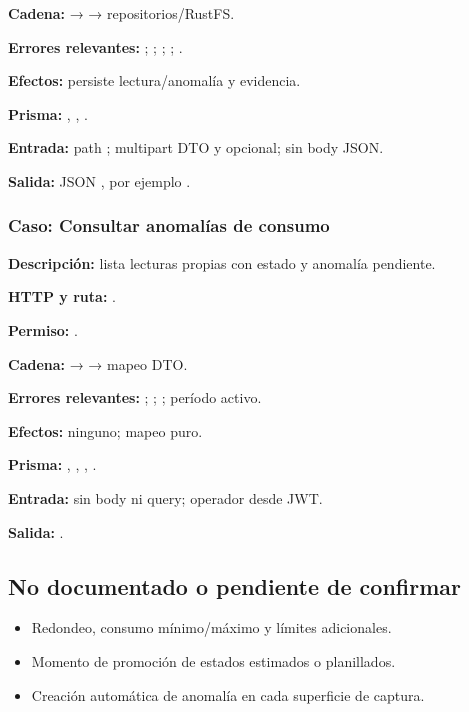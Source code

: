 \textbf{Cadena:} \texttt{} → \texttt{} → repositorios/RustFS.  

\textbf{Errores relevantes:} \texttt{}; \texttt{}; \texttt{}; \texttt{}; \texttt{}.  

\textbf{Efectos:} persiste lectura/anomalía y evidencia.  

\textbf{Prisma:} \texttt{}, \texttt{}, \texttt{}.  

\textbf{Entrada:} path \texttt{}; multipart DTO y \texttt{} opcional; sin body JSON.  

\textbf{Salida:} JSON \texttt{}, por ejemplo \texttt{}.


\subsubsection{Caso: Consultar anomalías de consumo}


\textbf{Descripción:} lista lecturas propias con estado \texttt{} y anomalía pendiente.  

\textbf{HTTP y ruta:} \texttt{}.  

\textbf{Permiso:} \texttt{}.  

\textbf{Cadena:} \texttt{} → \texttt{} → mapeo DTO.  

\textbf{Errores relevantes:} \texttt{}; \texttt{}; \texttt{}; \texttt{} período activo.  

\textbf{Efectos:} ninguno; mapeo puro.  

\textbf{Prisma:} \texttt{}, \texttt{}, \texttt{}, \texttt{}.  

\textbf{Entrada:} sin body ni query; operador desde JWT.  

\textbf{Salida:} \texttt{}.


\subsection{No documentado o pendiente de confirmar}


\begin{itemize}
\item Redondeo, consumo mínimo/máximo y límites adicionales.
\item Momento de promoción de estados estimados o planillados.
\item Creación automática de anomalía en cada superficie de captura.
\end{itemize}
